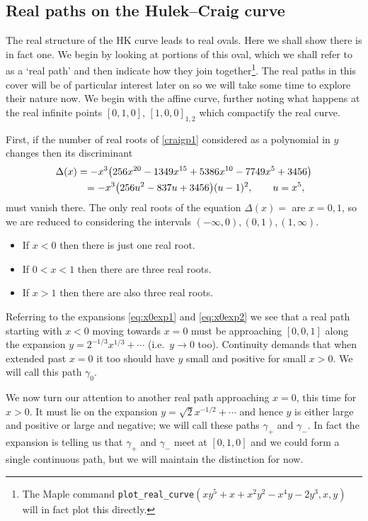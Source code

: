 \documentclass[pdftex]{sigma}
\numberwithin{equation}{section}
\begin{document}
\subsection[Real paths on the Hulek-Craig curve]{Real paths on the Hulek--Craig curve}\label{section3.3}

The real structure of the HK curve leads to real ovals. Here we shall show there is in fact one.
We begin by looking at portions of this oval, which we shall refer to as a `real path' and then
indicate how they join together\footnote{The Maple command {\tt{plot\_real\_curve}}$(x y^5 + x + x^2 y^2 - x^4 y - 2 y^3,x,y)$ will in fact plot this directly.}.
The real paths in this cover will be of particular interest later on
so we will take some time to explore their nature now. We begin with the af\/f\/ine curve, further noting what happens at the real inf\/inite points $[0,1,0]$, $[1,0,0]_{1,2}$ which compactify the real curve.

First, if the
number of real roots of \eqref{craigp1} considered as a polynomial in
$y$ changes then its discriminant
\begin{gather}
 \Delta(x) = -x^3\big(256 x^{20}-1349x^{15}+5386x^{10}-7749x^5+3456\big)\nonumber\\
 \hphantom{\Delta(x)}{}  =
 -x^3\big(256 u^2-837 u+3456\big)(u-1)^2, \qquad u=x^5,  \label{eq:disc}
\end{gather}
must vanish there. The only real roots of the equation $\Delta(x)=$ are $x=0,1$,
so we are reduced to considering the intervals $(-\infty,0), (0,1),
(1,\infty)$.
\begin{itemize}\itemsep=0pt
\item If $x < 0$ then there is just one real root.
\item If $0 < x < 1$ then there are three real roots.
\item If $x > 1$ then there are also three real roots.
\end{itemize}

Referring to the expansions \eqref{eq:x0exp1} and \eqref{eq:x0exp2} we
see that a real path starting with $x < 0$ moving towards $x=0$ must
be approaching $[0,0,1]$ along the expansion $y = 2^{-1/3} x^{1/3}
+\cdots$ (i.e.\ $y\rightarrow 0$ too). Continuity demands that when
extended past $x=0$ it  too should have $y$ small and positive for small
$x>0$. We will call this path $\gamma_0$.

We now turn our attention to another real path approaching $x=0$, this
time for $x>0$. It must lie on the expansion $y=\sqrt{2} x^{-1/2} +
\cdots$ and hence $y$ is either large and positive or large and
negative; we will call these paths $\gamma_{+}$ and $\gamma_{-}$. In
fact the expansion is telling us that $\gamma_{+}$ and $\gamma_{-}$
meet at $[0,1,0]$ and we could form a single continuous path, but we
will maintain the distinction for now.
\end{document}
